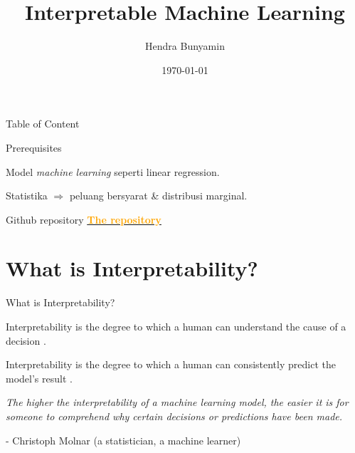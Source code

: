 \documentclass[aspectratio=169]{beamer}
\title[Interpretability]{Interpretable Machine Learning}
\author{Hendra Bunyamin}
\institute{Maranatha Christian University}
\date{\today}
\begin{document}
\maketitle


\begin{frame}{Table of Content}
    \tableofcontents
\end{frame}

\begin{frame}{Prerequisites}
	\begin{vfilleditems}
		\item Model \textit{machine learning} seperti linear regression.
		\item Statistika $\Rightarrow$ peluang bersyarat \& distribusi marginal.
	\end{vfilleditems}
\end{frame}

\begin{frame}{Github repository}
	\href{https://github.com/hbunyamin/2021-nuni-it-online-seminar}{\textcolor{orange}{\textbf{The repository}} }
\end{frame}

\section{What is Interpretability?}
\begin{frame}{What is Interpretability? }
    \begin{vfilleditems}
	\item Interpretability is the degree to which a human can understand the cause of a decision  \citep{miller2019explanation}.
	\item Interpretability is the degree to which a human can consistently predict the model's result \citep{kim2016examples}.
	\end{vfilleditems}
\end{frame}

\begin{frame}
	\centering
	\textit{The higher the interpretability of a machine learning model, the easier it is for someone to comprehend why certain decisions or predictions have been made.}
	
	\bigskip
	- Christoph Molnar (a statistician, a machine learner)
\end{frame}
\end{document}
